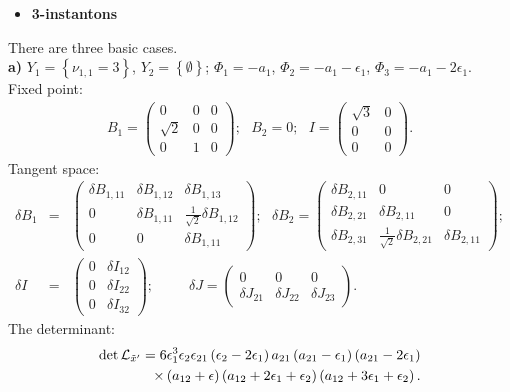 \documentclass[a4paper,12pt]{article}
\begin{document}
\begin{itemize}
\item {\bf 3-instantons} \end{itemize} There are three basic
cases. \\
{\bf a)} $Y_1=\left\{\nu_{1,1}=3\right\}$,
$Y_2=\left\{\emptyset\right\}$; $\Phi_1=-a_1$,
$\Phi_2=-a_1-\epsilon_1$,
$\Phi_3=-a_1-2\epsilon_1$. \\
Fixed point:
\begin{eqnarray}
B_1=\left(\begin{array}{ccc} 0 & 0 & 0\\ \sqrt{2} & 0 & 0 \\ 0 & 1 & 0
\end{array}\right); \, \, \, \,
B_2=0; \, \, \, \, I=\left(\begin{array}{cc} \sqrt{3} & 0 \\ 0 & 0 \\0 & 0
\end{array}\right).
\end{eqnarray}
Tangent space:
\begin{eqnarray}
\delta B_1 &=& \left(\begin{array}{ccc} \delta B_{1,11} & \delta B_{1,12} & \delta B_{1,13}\\ 0 & \delta
B_{1,11} & \frac{1}{\sqrt{2}}\delta B_{1,12} \\0 & 0 & \delta B_{1,11}
\end{array}\right); \, \, \, \,
\delta B_2 =\left(\begin{array}{ccc} \delta B_{2,11} & 0 & 0 \\ \delta B_{2,21} & \delta B_{2,11} & 0 \\ \delta
B_{2,31} & \frac{1}{\sqrt{2}}\delta B_{2,21} & \delta B_{2,11}
\end{array}\right); \nonumber \\
\delta I &=&\left(\begin{array}{cc} 0 & \delta I_{12} \\ 0 & \delta I_{22} \\ 0 & \delta I_{32}
\end{array}\right); \, \, \, \, \, \, \, \, \, \, \, \, \, \, \,
\delta J=\left(\begin{array}{ccc} 0 & 0 & 0 \\ \delta J_{21} & \delta J_{22} & \delta J_{23}
\end{array}\right).
\end{eqnarray}
The determinant:
\begin{eqnarray}
\det {\cal L}_{{\tilde x}'}=6 \epsilon_1^3 \epsilon_2
\epsilon_{21} \left(\epsilon_2-2\epsilon_1\right) a_{21}
\left(a_{21}-\epsilon_1 \right) \left(a_{21}-2\epsilon_1 \right) \nonumber \\
\times \left(a_{12}+\epsilon \right) \left(a_{12}+2 \epsilon_1 +\epsilon_2 \right) \left(a_{12}+3 \epsilon_1
+\epsilon_2 \right).
\end{eqnarray}
\end{document}

